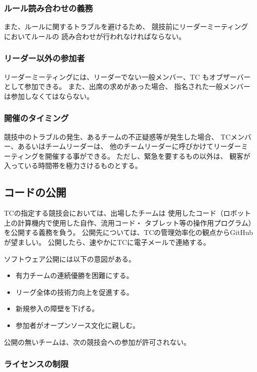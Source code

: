 \documentclass[a4j]{jarticle}
\begin{document}
\subsubsection{ルール読み合わせの義務}

また、ルールに関するトラブルを避けるため、
競技前にリーダーミーティングにおいてルールの
読み合わせが行われなければならない。

\subsubsection{リーダー以外の参加者}

リーダーミーティングには、リーダーでない一般メンバー、TC
もオブザーバーとして参加できる。
また、出席の求めがあった場合、
指名された一般メンバーは参加しなくてはならない。

\subsubsection{開催のタイミング}

競技中のトラブルの発生、あるチームの不正疑惑等が発生した場合、
TCメンバー、あるいはチームリーダーは、
他のチームリーダーに呼びかけてリーダーミーティングを開催する事ができる。
ただし、緊急を要するもの以外は、
観客が入っている時間帯を極力さけるものとする。

\subsection{コードの公開}

TCの指定する競技会においては、出場したチームは
使用したコード（ロボット上の計算機内で使用した自作、流用コード・
タブレット等の操作用プログラム）を公開する義務を負う。
公開先については、TCの管理効率化の観点からGitHubが望ましい。
公開したら、速やかにTCに電子メールで連絡する。


ソフトウェア公開には以下の意図がある。
\begin{itemize}
	\item 有力チームの連続優勝を困難にする。
	\item リーグ全体の技術力向上を促進する。
	\item 新規参入の障壁を下げる。
	\item 参加者がオープンソース文化に親しむ。
\end{itemize}
公開の無いチームは、次の競技会への参加が許可されない。

\subsubsection{ライセンスの制限}
\end{document}
